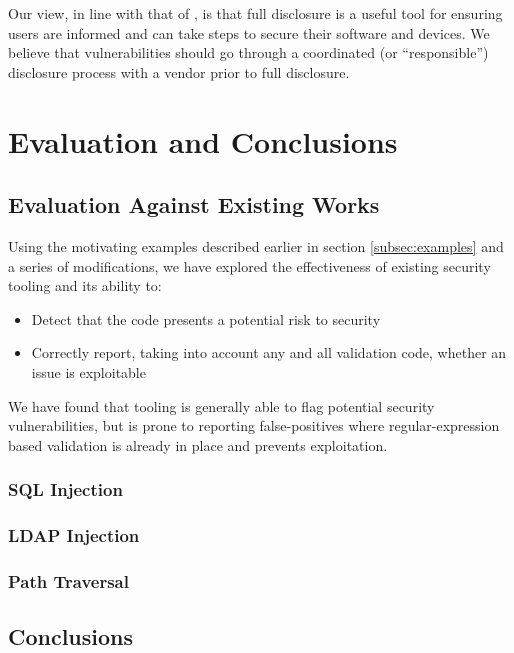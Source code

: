 \documentclass[a4paper,openany,12pt]{book}
\begin{document}
Our view, in line with that of \citeauthor{schneier2007fd}, is that full disclosure is a useful tool for ensuring users
are informed and can take steps to secure their software and devices.
We believe that vulnerabilities should go through a coordinated (or ``responsible'') disclosure process with a vendor
prior to full disclosure.

\chapter{Evaluation and Conclusions}

\section{Evaluation Against Existing Works}

Using the motivating examples described earlier in section \ref{subsec:examples} and a series of modifications,
we have explored the effectiveness of existing security tooling and its ability to:

\begin{itemize}
    \item Detect that the code presents a potential risk to security
    \item Correctly report, taking into account any and all validation code, whether an issue is exploitable
\end{itemize}

We have found that tooling is generally able to flag potential security vulnerabilities, but is prone to reporting
false-positives where regular-expression based validation is already in place and prevents exploitation.

\subsection{SQL Injection}



\subsection{LDAP Injection}

\subsection{Path Traversal}


\section{Conclusions}
\end{document}
